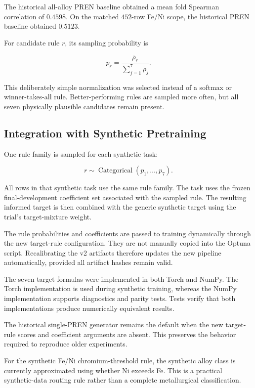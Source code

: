 \documentclass{article}
\begin{document}
The historical all-alloy PREN baseline obtained a mean fold Spearman
correlation of \(0.4598\). On the matched \(452\)-row Fe/Ni scope, the
historical PREN baseline obtained \(0.5123\).

For candidate rule \(r\), its sampling probability is

\[
p_r
=
\frac{\overline{\rho}_r}
{\sum_{j=1}^{7}\overline{\rho}_j}.
\]

This deliberately simple normalization was selected instead of a softmax or
winner-takes-all rule. Better-performing rules are sampled more often, but all
seven physically plausible candidates remain present.

\subsection{Integration with Synthetic Pretraining}
\label{sec:epit-rule-synthetic-training}

One rule family is sampled for each synthetic task:

\[
r
\sim
\operatorname{Categorical}(p_1,\ldots,p_7).
\]

All rows in that synthetic task use the same rule family. The task uses the
frozen final-development coefficient set associated with the sampled rule.
The resulting informed target is then combined with the generic synthetic
target using the trial's target-mixture weight.

The rule probabilities and coefficients are passed to training dynamically
through the new target-rule configuration. They are not manually copied into
the Optuna script. Recalibrating the v2 artifacts therefore updates the new
pipeline automatically, provided all artifact hashes remain valid.

The seven target formulas were implemented in both Torch and NumPy. The Torch
implementation is used during synthetic training, whereas the NumPy
implementation supports diagnostics and parity tests. Tests verify that both
implementations produce numerically equivalent results.

The historical single-PREN generator remains the default when the new
target-rule scores and coefficient arguments are absent. This preserves the
behavior required to reproduce older experiments.

For the synthetic Fe/Ni chromium-threshold rule, the synthetic alloy class is
currently approximated using whether Ni exceeds Fe. This is a practical
synthetic-data routing rule rather than a complete metallurgical
classification.
\end{document}
